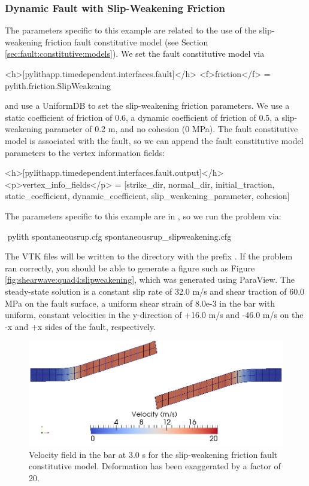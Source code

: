 \subsubsection{Dynamic Fault with Slip-Weakening Friction}

The parameters specific to this example are related to the use of
the slip-weakening friction fault constitutive model (see Section
\vref{sec:fault:constitutive:models}). We set the fault constitutive
model via
\begin{cfg}
<h>[pylithapp.timedependent.interfaces.fault]</h>
<f>friction</f> = pylith.friction.SlipWeakening
\end{cfg}
and use a UniformDB to set the slip-weakening friction parameters.
We use a static coefficient of friction of 0.6, a dynamic coefficient
of friction of 0.5, a slip-weakening parameter of 0.2 m, and no cohesion
(0 MPa). The fault constitutive model is associated with the fault,
so we can append the fault constitutive model parameters to the vertex
information fields:
\begin{cfg}
<h>[pylithapp.timedependent.interfaces.fault.output]</h>
<p>vertex_info_fields</p> = [strike_dir, normal_dir, initial_traction, static_coefficient, dynamic_coefficient, slip_weakening_parameter, cohesion]
\end{cfg}
The parameters specific to this example are in ,
so we run the problem via:
\begin{shell}
$$ pylith spontaneousrup.cfg spontaneousrup_slipweakening.cfg
\end{shell}
The VTK files will be written to the  directory with
the prefix . If the problem ran correctly, you
should be able to generate a figure such as Figure \vref{fig:shearwave:quad4:slipweakening},
which was generated using ParaView. The steady-state solution is a
constant slip rate of 32.0 m/s and shear traction of 60.0 MPa on the
fault surface, a uniform shear strain of 8.0e-3 in the bar with uniform,
constant velocities in the y-direction of +16.0 m/s and -46.0 m/s
on the -x and +x sides of the fault, respectively.

\begin{figure}
  \includegraphics[scale=0.5]{examples/figs/shearwave_quad4slipweakening30}
  \caption{Velocity field in the bar at 3.0 s for the slip-weakening friction
    fault constitutive model. Deformation has been exaggerated by a factor
    of 20.}
  \label{fig:shearwave:quad4:slipweakening}
\end{figure}


